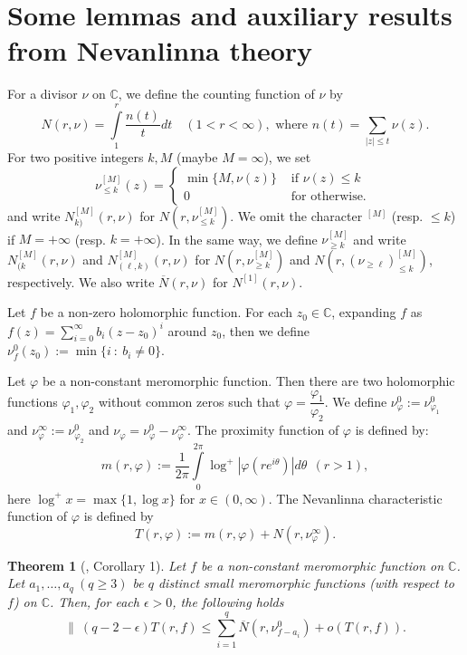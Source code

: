 \documentclass[12pt,leqno]{amsart}
\newtheorem{theorem}[equation]{Theorem}
\newcommand{\C}{{\mathbb{C}}}
\numberwithin{equation}{section}
\begin{document}
\section{Some lemmas and auxiliary results from Nevanlinna theory}

For a divisor $\nu$ on $\C$, we define the counting function of $\nu$ by
$$N(r,\nu)=\int\limits_1^r \dfrac {n(t)}{t}dt \quad (1<r<\infty), \text{ where } n(t)=\sum\limits_{|z|\leq t}\nu (z).$$
For two positive integers $k,M$ (maybe $M= \infty$), we set 
$$ \nu^{[M]}_{\leq k} (z)=
\begin{cases}
\min\{M,\nu (z)\}&\text{ if }\nu (z)\leq k\\
0&\text{ for otherwise. }
\end{cases}$$
and write $N^{[M]}_{k)}(r,\nu)$ for $N(r,\nu^{[M]}_{\leq k})$. We omit the character $^{[M]}$ (resp. $\leq k$) if $M=+\infty$ (resp. $k=+\infty$). In the same way, we define $\nu^{[M]}_{\ge k}$ and write $N^{[M]}_{(k}(r,\nu)$ and $N^{[M]}_{(\ell,k)}(r,\nu)$ for $N(r,\nu^{[M]}_{\ge k})$ and $N(r,(\nu_{\ge\ell})_{\le k}^{[M]})$, respectively. We also write $\overline N(r,\nu)$ for $N^{[1]}(r,\nu)$.

Let $f$ be a non-zero holomorphic function. For each $z_0\in\C$, expanding $f$ as
$ f(z) =\sum_{i=0}^\infty b_i(z-z_0)^i$ around $z_0$, then we define $\nu^{0}_{f}(z_0):=\min\{i\ :\ b_i \ne 0\}$. 

Let $\varphi$ be a non-constant meromorphic function. Then there are two holomorphic functions $\varphi_1,\varphi_2$ without common zeros such that $\varphi =\dfrac{\varphi_1}{\varphi_2}$. We define 
$ \nu_\varphi^0:=\nu_{\varphi_1}^0$ and $\nu_\varphi^\infty:=\nu_{\varphi_2}^0$ and $\nu_\varphi=\nu^0_\varphi -\nu^\infty_\varphi$. The proximity function of $\varphi$ is defined by:
$$ m(r,\varphi ):=\frac{1}{2\pi}\int\limits_{0}^{2\pi}\log^+|\varphi (re^{i\theta})|d\theta\ \ (r>1), $$
here $\log^+x=\max\{1,\log x\}$ for $x\in (0,\infty )$. The Nevanlinna characteristic function of $\varphi$ is defined by
$$ T(r,\varphi ):=m(r,\varphi ) +N(r,\nu^\infty_{\varphi}).$$

\begin{theorem}[\cite{Y}, Corollary 1]\label{2.1}
Let $f$ be a non-constant meromorphic function on $\C$. Let $a_1,\dots ,a_q\ (q\ge 3)$ be $q$ distinct small meromorphic functions (with respect to $f$) on $\C$. Then, for each $\epsilon >0$, the
following holds
$$\|\ (q-2-\epsilon)T(r,f)\le \sum_{i=1}^q\overline N(r,\nu^0_{f-a_i})+o(T(r,f)).$$
\end{theorem}
\end{document}
